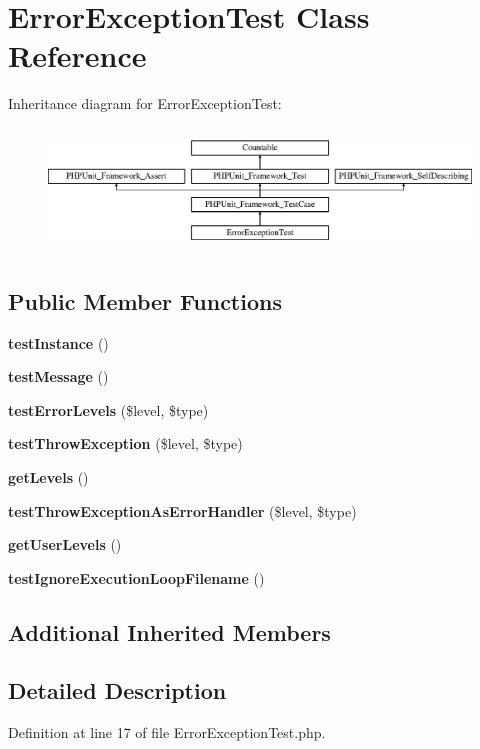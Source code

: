 \section{Error\+Exception\+Test Class Reference}
\label{class_psy_1_1_test_1_1_exception_1_1_error_exception_test}
Inheritance diagram for Error\+Exception\+Test\+:\begin{figure}[H]
\begin{center}
\leavevmode
\includegraphics[height=3.303835cm]{class_psy_1_1_test_1_1_exception_1_1_error_exception_test}
\end{center}
\end{figure}
\subsection*{Public Member Functions}
\begin{DoxyCompactItemize}
\item 
{\bf test\+Instance} ()
\item 
{\bf test\+Message} ()
\item 
{\bf test\+Error\+Levels} (\$level, \$type)
\item 
{\bf test\+Throw\+Exception} (\$level, \$type)
\item 
{\bf get\+Levels} ()
\item 
{\bf test\+Throw\+Exception\+As\+Error\+Handler} (\$level, \$type)
\item 
{\bf get\+User\+Levels} ()
\item 
{\bf test\+Ignore\+Execution\+Loop\+Filename} ()
\end{DoxyCompactItemize}
\subsection*{Additional Inherited Members}


\subsection{Detailed Description}


Definition at line 17 of file Error\+Exception\+Test.\+php.




